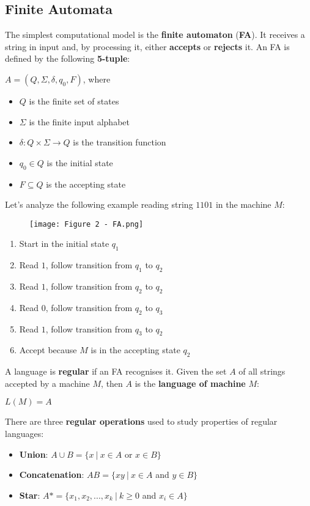 \documentclass{article}
\begin{document}
\subsection{Finite Automata}
The simplest computational model is the \textbf{finite automaton} (\textbf{FA}). It receives a string in input and, by processing it, either \textbf{accepts} or \textbf{rejects} it.
An FA is defined by the following \textbf{5-tuple}:
\begin{center}
    $A = (Q, \Sigma, \delta, q_0, F)$, where
\end{center}
\begin{itemize}
    \item $Q$ is the finite set of states
    \item $\Sigma$ is the finite input alphabet
    \item $\delta:Q\times\Sigma\rightarrow Q$ is the transition function
    \item $q_0 \in Q$ is the initial state
    \item $F \subseteq Q$ is the accepting state
\end{itemize}
Let's analyze the following example reading string $1101$ in the machine $M$:
\begin{figure}[H]
    \centering
    \texttt{[image: Figure 2 - FA.png]}
\end{figure}
\begin{enumerate}
    \item Start in the initial state $q_1$
    \item Read $1$, follow transition from $q_1$ to $q_2$
    \item Read $1$, follow transition from $q_2$ to $q_2$
    \item Read $0$, follow transition from $q_2$ to $q_3$
    \item Read $1$, follow transition from $q_3$ to $q_2$
    \item Accept because $M$ is in the accepting state $q_2$
\end{enumerate}
A language is \textbf{regular} if an FA recognises it. Given the set $A$ of all strings accepted by a machine $M$, then $A$ is the \textbf{language of machine} $M$:
\begin{center}
    $L(M) = A$ 
\end{center}
\newpage
\noindent
There are three \textbf{regular operations} used to study properties of regular languages:
\begin{itemize}
    \item \textbf{Union}: $A \cup B = \{x \ | \ x \in A$ or $x \in B\}$
    \item \textbf{Concatenation}: $AB = \{xy \ | \ x \in A$ and $y \in B\}$
    \item \textbf{Star}: $A* = \{x_1,x_2,...,x_k \ | \ k \geq 0$ and $x_i \in A\}$
\end{itemize}
\end{document}
